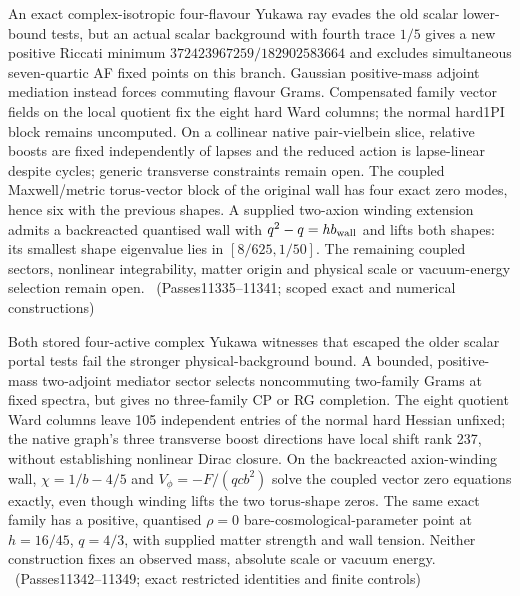 An exact complex-isotropic four-flavour Yukawa ray evades the old scalar
lower-bound tests, but an actual scalar background with fourth trace $1/5$
gives a new positive Riccati minimum $372423967259/182902583664$ and excludes
simultaneous seven-quartic AF fixed points on this branch. Gaussian positive-mass
adjoint mediation instead forces commuting flavour Grams. Compensated family
vector fields on the local quotient fix the eight hard Ward columns; the
normal hard1PI block remains uncomputed. On a collinear native pair-vielbein
slice, relative boosts are fixed independently of lapses and the reduced action
is lapse-linear despite cycles; generic transverse constraints remain open.
The coupled Maxwell/metric torus-vector block of the original wall has four
exact zero modes, hence six with the previous shapes. A supplied two-axion
winding extension admits a backreacted quantised wall with $q^2-q=h b_{\rm wall}$
and lifts both shapes: its smallest shape eigenvalue lies in $[8/625,1/50]$.
The remaining coupled sectors, nonlinear integrability, matter origin and
physical scale or vacuum-energy selection remain open.
\tierC\ (Passes11335--11341; scoped exact and numerical constructions)

Both stored four-active complex Yukawa witnesses that escaped the older scalar
portal tests fail the stronger physical-background bound. A bounded, positive-mass
two-adjoint mediator sector selects noncommuting two-family Grams at fixed spectra,
but gives no three-family CP or RG completion. The eight quotient Ward columns
leave 105 independent entries of the normal hard Hessian unfixed; the native
graph's three transverse boost directions have local shift rank 237, without
establishing nonlinear Dirac closure. On the backreacted axion-winding wall,
$\chi=1/b-4/5$ and $V_\phi=-F/(qcb^2)$ solve the coupled vector zero equations
exactly, even though winding lifts the two torus-shape zeros. The same exact
family has a positive, quantised $\rho=0$ bare-cosmological-parameter point at
$h=16/45$, $q=4/3$, with supplied matter strength and wall tension. Neither
construction fixes an observed mass, absolute scale or vacuum energy.
\tierC\ (Passes11342--11349; exact restricted identities and finite controls)

